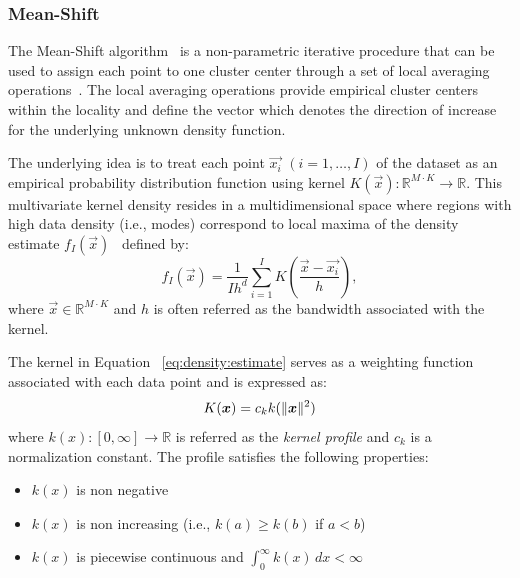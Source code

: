 \subsubsection{Mean-Shift}
\label{Mean-Shift}

The Mean-Shift algorithm~\cite{EstimationGradient} is a non-parametric iterative procedure that can be used to assign each point to one cluster center through a set of local averaging operations~\cite{EstimationGradient}. The local averaging operations provide empirical cluster centers within the locality and define the vector which denotes the direction of increase for the underlying unknown density function.

The underlying idea is to treat each point $\vec{x_{i}}$ $(i=1,\ldots, I)$ of the dataset as an empirical probability distribution function using  kernel $K(\vec{x}): \mathbb{R}^{M\cdot K}\rightarrow \mathbb{R}$. This multivariate kernel density resides in a multidimensional space where regions with high data density (i.e., modes) correspond to local maxima of the density estimate $f_{I}(\vec{x})$~\cite{CacoullosEstimation}  defined by:
\begin{equation}
    f_{I}(\vec{x})=\frac{1}{Ih^{d}}\sum_{i=1}^{I} K\left(\frac{\vec{x}-\vec{x_{i}}}{h}\right),
    \label{eq:density:estimate}
\end{equation}
where $\vec{x}\in \mathbb{R}^{M\cdot K}$ and $h$ is often referred as the bandwidth associated with the kernel.

The kernel in Equation ~\ref{eq:density:estimate} serves as a weighting function~\cite{CacoullosEstimation} associated with each data point and is expressed as:
\begin{equation}
    K(\bm{x})=c_{k} k(\lVert\bm{x}\rVert^{2})
\end{equation}
where $k(x):[0,\infty]\rightarrow \mathbb{R}$ is referred as the \emph{kernel profile} and $c_{k}$ is a normalization constant. The profile satisfies the following properties:
\begin{itemize}
  \item $k(x)$ is non negative
  \item $k(x)$ is non increasing (i.e., $k(a)\geq k(b)$ if $a<b$)
  \item $k(x)$ is piecewise continuous and $\int_0^\infty \! k(x) \, dx < \infty$
\end{itemize}

